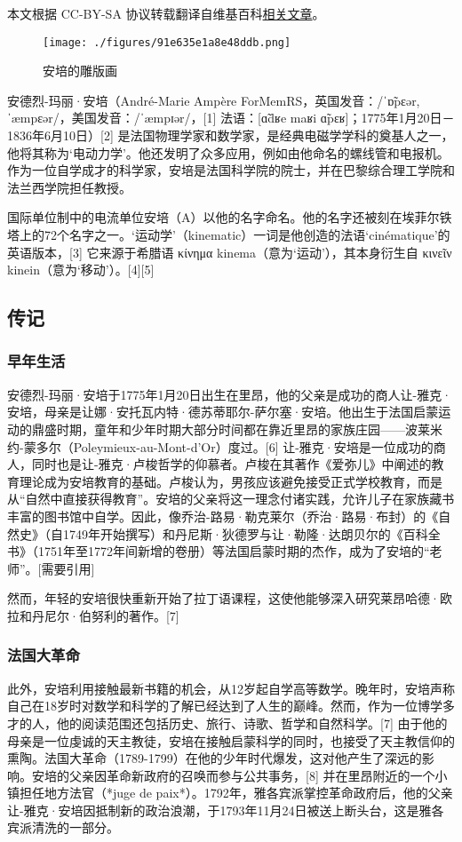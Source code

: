 
本文根据 CC-BY-SA 协议转载翻译自维基百科\href{https://en.wikipedia.org/wiki/Andr\%C3\%A9-Marie_Amp\%C3\%A8re}{相关文章}。

\begin{figure}[ht]
\centering
\texttt{[image: ./figures/91e635e1a8e48ddb.png]}
\caption{安培的雕版画} \label{fig_AP_2}
\end{figure}
安德烈-玛丽·安培（André-Marie Ampère ForMemRS，英国发音：/ˈɒ̃pɛər, ˈæmpɛər/，美国发音：/ˈæmpɪər/，[1] 法语：[ɑ̃dʁe maʁi ɑ̃pɛʁ]；1775年1月20日－1836年6月10日）[2] 是法国物理学家和数学家，是经典电磁学学科的奠基人之一，他将其称为‘电动力学’。他还发明了众多应用，例如由他命名的螺线管和电报机。作为一位自学成才的科学家，安培是法国科学院的院士，并在巴黎综合理工学院和法兰西学院担任教授。

国际单位制中的电流单位安培（A）以他的名字命名。他的名字还被刻在埃菲尔铁塔上的72个名字之一。‘运动学’（kinematic）一词是他创造的法语‘cinématique’的英语版本，[3] 它来源于希腊语 κίνημα kinema（意为‘运动’），其本身衍生自 κινεῖν kinein（意为‘移动’）。[4][5]
\subsection{传记}
\subsubsection{早年生活} 
安德烈-玛丽·安培于1775年1月20日出生在里昂，他的父亲是成功的商人让-雅克·安培，母亲是让娜·安托瓦内特·德苏蒂耶尔-萨尔塞·安培。他出生于法国启蒙运动的鼎盛时期，童年和少年时期大部分时间都在靠近里昂的家族庄园——波莱米约-蒙多尔（Poleymieux-au-Mont-d'Or）度过。[6] 让-雅克·安培是一位成功的商人，同时也是让-雅克·卢梭哲学的仰慕者。卢梭在其著作《爱弥儿》中阐述的教育理论成为安培教育的基础。卢梭认为，男孩应该避免接受正式学校教育，而是从“自然中直接获得教育”。安培的父亲将这一理念付诸实践，允许儿子在家族藏书丰富的图书馆中自学。因此，像乔治-路易·勒克莱尔（乔治·路易·布封）的《自然史》（自1749年开始撰写）和丹尼斯·狄德罗与让·勒隆·达朗贝尔的《百科全书》（1751年至1772年间新增的卷册）等法国启蒙时期的杰作，成为了安培的“老师”。[需要引用]  

然而，年轻的安培很快重新开始了拉丁语课程，这使他能够深入研究莱昂哈德·欧拉和丹尼尔·伯努利的著作。[7]
\subsubsection{法国大革命}
此外，安培利用接触最新书籍的机会，从12岁起自学高等数学。晚年时，安培声称自己在18岁时对数学和科学的了解已经达到了人生的巅峰。然而，作为一位博学多才的人，他的阅读范围还包括历史、旅行、诗歌、哲学和自然科学。[7] 由于他的母亲是一位虔诚的天主教徒，安培在接触启蒙科学的同时，也接受了天主教信仰的熏陶。法国大革命（1789-1799）在他的少年时代爆发，这对他产生了深远的影响。安培的父亲因革命新政府的召唤而参与公共事务，[8] 并在里昂附近的一个小镇担任地方法官（*juge de paix*）。1792年，雅各宾派掌控革命政府后，他的父亲让-雅克·安培因抵制新的政治浪潮，于1793年11月24日被送上断头台，这是雅各宾派清洗的一部分。

